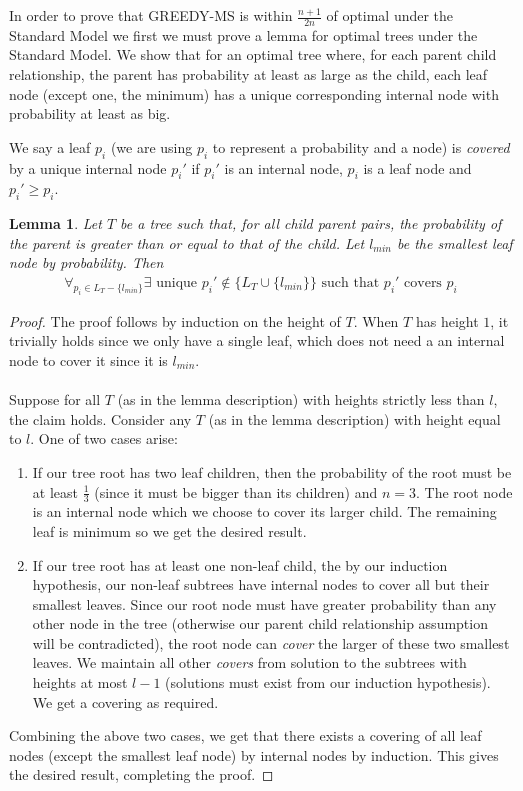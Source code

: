 \documentclass[letterpaper,12pt,titlepage,oneside,final]{book}
\theoremstyle{plain}
\newtheorem{lem}[thm]{Lemma}
\begin{document}
In order to prove that GREEDY-MS is within $\frac{n+1}{2n}$ of optimal under the Standard Model  we first we must prove a lemma for optimal trees under the Standard Model. We show that for an optimal tree where, for each parent child relationship, the parent has probability at least as large as the child, each leaf node (except one, the minimum) has a unique corresponding internal node with probability at least as big.

We say a leaf $p_i$ (we are using $p_i$ to represent a probability and a node) is \textit{covered} by a unique internal node $p_i'$ if $p_i'$ is an internal node, $p_i$ is a leaf node and $p_i' \geq p_i$.

\begin{lem}\label{leavesCovered}
Let $T$ be a tree such that, for all child parent pairs, the probability of the parent is greater than or equal to that of the child. Let $l_{min}$ be the smallest leaf node by probability. Then
\begin{align*}
\forall_{p_i \in L_T-\{l_{min}\}} \exists \text{ unique } p_i' \notin \{L_T \cup \{l_{min}\}\} \text{ such that } p_i' \text{ covers } p_i
\end{align*}
\end{lem}
\begin{proof}
The proof follows by induction on the height of $T$. When $T$ has height $1$, it trivially holds since we only have a single leaf, which does not need a an internal node to cover it since it is $l_{min}$. \\~\\ 
Suppose for all $T$ (as in the lemma description) with heights strictly less than $l$, the claim holds. Consider any $T$ (as in the lemma description) with height equal to $l$. One of two cases arise:

\begin{enumerate}
\item If our tree root has two leaf children, then the probability of the root must be at least $\frac{1}{3}$ (since it must be bigger than its children) and $n=3$. The root node is an internal node which we choose to cover its larger child. The remaining leaf is minimum so we get the desired result.

\item If our tree root has at least one non-leaf child, the by our induction hypothesis, our non-leaf subtrees have internal nodes to cover all but their smallest leaves. Since our root node must have greater probability than any other node in the tree (otherwise our parent child relationship assumption will be contradicted), the root node can \textit{cover} the larger of these two smallest leaves. We maintain all other \textit{covers} from solution to the subtrees with heights at most $l-1$ (solutions must exist from our induction hypothesis). We get a covering as required.
\end{enumerate}

\noindent Combining the above two cases, we get that there exists a covering of all leaf nodes (except the smallest leaf node) by internal nodes by induction. This gives the desired result, completing the proof.

\end{proof}
\end{document}
